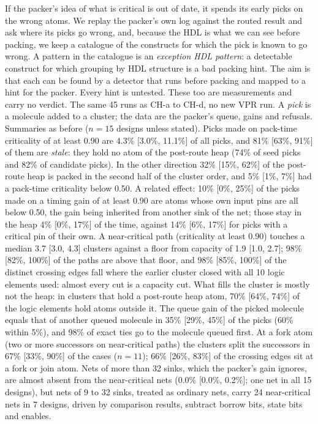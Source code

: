  If the packer's idea of what is critical is out of date, it spends its early picks on the wrong atoms. We replay the packer's own log against the routed result and ask where its picks go wrong, and, because the HDL is what we can see before packing, we keep a catalogue of the constructs for which the pick is known to go wrong. A pattern in the catalogue is an \emph{exception HDL pattern}: a detectable construct for which grouping by HDL structure is a bad packing hint. The aim is that each can be found by a detector that runs before packing and mapped to a hint for the packer. Every hint is untested. These too are measurements and carry no verdict.
 The same 45 runs as CH-a to CH-d, no new VPR run. A \emph{pick} is a molecule added to a cluster; the data are the packer's queue, gains and refusals. Summaries as before ($n=15$ designs unless stated).
 Picks made on pack-time criticality of at least 0.90 are 4.3\% [3.0\%, 11.1\%] of all picks, and 81\% [63\%, 91\%] of them are \emph{stale}: they hold no atom of the post-route heap (74\% of seed picks and 82\% of candidate picks). In the other direction 32\% [15\%, 62\%] of the post-route heap is packed in the second half of the cluster order, and 5\% [1\%, 7\%] had a pack-time criticality below 0.50. A related effect: 10\% [0\%, 25\%] of the picks made on a timing gain of at least 0.90 are atoms whose own input pins are all below 0.50, the gain being inherited from another sink of the net; those stay in the heap 4\% [0\%, 17\%] of the time, against 14\% [6\%, 17\%] for picks with a critical pin of their own.
 A near-critical path (criticality at least 0.90) touches a median 3.7 [3.0, 4.3] clusters against a floor from capacity of 1.9 [1.0, 2.7]; 98\% [82\%, 100\%] of the paths are above that floor, and 98\% [85\%, 100\%] of the distinct crossing edges fall where the earlier cluster closed with all 10 logic elements used: almost every cut is a capacity cut. What fills the cluster is mostly not the heap: in clusters that hold a post-route heap atom, 70\% [64\%, 74\%] of the logic elements hold atoms outside it. The queue gain of the picked molecule equals that of another queued molecule in 35\% [29\%, 45\%] of the picks (60\% within 5\%), and 98\% of exact ties go to the molecule queued first.
 At a fork atom (two or more successors on near-critical paths) the clusters split the successors in 67\% [33\%, 90\%] of the cases ($n=11$); 66\% [26\%, 83\%] of the crossing edges sit at a fork or join atom. Nets of more than 32 sinks, which the packer's gain ignores, are almost absent from the near-critical nets (0.0\% [0.0\%, 0.2\%]; one net in all 15 designs), but nets of 9 to 32 sinks, treated as ordinary nets, carry 24 near-critical nets in 7 designs, driven by comparison results, subtract borrow bits, state bits and enables.
